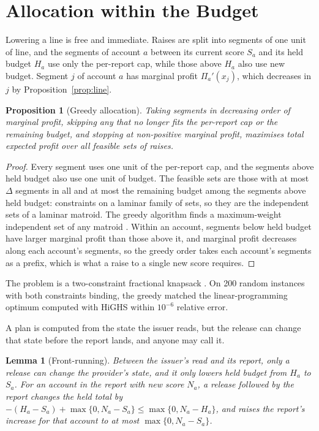 \documentclass[preprint,11pt,authoryear]{elsarticle}
\newtheorem{proposition}{Proposition}
\newtheorem{lemma}{Lemma}
\begin{document}
\section{Allocation within the Budget}\label{sec:allocation}

Lowering a line is free and immediate. Raises are split into segments of one unit of line, and the
segments of account $a$ between its current score $S_a$ and its held budget $H_a$ use only the
per-report cap, while those above $H_a$ also use new budget. Segment $j$ of account $a$ has marginal
profit $\Pi_a'(x_j)$, which decreases in $j$ by Proposition~\ref{prop:line}.

\begin{proposition}[Greedy allocation]\label{prop:greedy}
Taking segments in decreasing order of marginal profit, skipping any that no longer fits the
per-report cap or the remaining budget, and stopping at non-positive marginal profit, maximises total
expected profit over all feasible sets of raises.
\end{proposition}

\begin{proof}
Every segment uses one unit of the per-report cap, and the segments above held budget also use one
unit of budget. The feasible sets are those with at most $\Delta$ segments in all and at most the
remaining budget among the segments above held budget: constraints on a laminar family of sets, so
they are the independent sets of a laminar matroid. The greedy algorithm finds a maximum-weight
independent set of any matroid \citep{edmonds1971matroids}. Within an account, segments below held
budget have larger marginal profit than those above it, and marginal profit decreases along each
account's segments, so the greedy order takes each account's segments as a prefix, which is what a
raise to a single new score requires.
\end{proof}

The problem is a two-constraint fractional knapsack \citep{dantzig1957discrete}. On 200 random
instances with both constraints binding, the greedy matched the linear-programming optimum computed
with HiGHS \citep{huangfu2018highs} within $10^{-6}$ relative error.

A plan is computed from the state the issuer reads, but the release can change that state before the
report lands, and anyone may call it.

\begin{lemma}[Front-running]\label{lem:frontrun}
Between the issuer's read and its report, only a release can change the provider's state, and it only
lowers held budget from $H_a$ to $S_a$. For an account in the report with new score $N_a$, a release
followed by the report changes the held total by $-(H_a-S_a)+\max\{0,N_a-S_a\}\le\max\{0,N_a-H_a\}$,
and raises the report's increase for that account to at most $\max\{0,N_a-S_a\}$.
\end{lemma}
\end{document}
